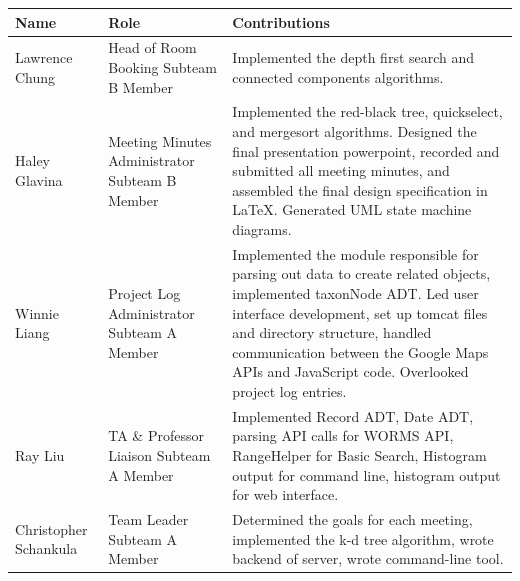 \documentclass{article}
\begin{document}
\begin{table}[h]
	\centering
	\begin{tabular}{p{0.16\hsize}p{0.30\hsize}p{0.46\hsize}}
		\toprule
		\textbf{Name} & \textbf{Role} & \textbf{Contributions}\\
		\midrule
		Lawrence Chung
		& Head of Room Booking \newline Subteam B Member
		& Implemented the depth first search and connected components algorithms. \\
		\midrule
		Haley Glavina
		& Meeting Minutes Administrator \newline Subteam B Member
		& Implemented the red-black tree, quickselect, and mergesort algorithms. Designed the final presentation powerpoint, recorded and submitted all meeting minutes, and assembled the final design specification in LaTeX. Generated UML state machine diagrams.\\
		\midrule
		Winnie Liang
		& Project Log Administrator \newline Subteam A Member
		& Implemented the module responsible for parsing out data to create related objects, implemented taxonNode ADT. Led user interface development, set up tomcat files and directory structure,  handled communication between the Google Maps APIs and JavaScript code. Overlooked project log entries.\\
		\midrule
		Ray Liu
		& TA \& Professor Liaison \newline Subteam A Member
		& Implemented Record ADT, Date ADT, parsing API calls for WORMS API, RangeHelper for Basic Search, Histogram output for command line, histogram output for web interface.\\
		\midrule
		Christopher Schankula
		& Team Leader \newline Subteam A Member
		& Determined the goals for each meeting, implemented the k-d tree algorithm, wrote backend of server, wrote command-line tool. \\		
		\bottomrule
	\end{tabular}
\end{table}


\newpage
\end{document}
